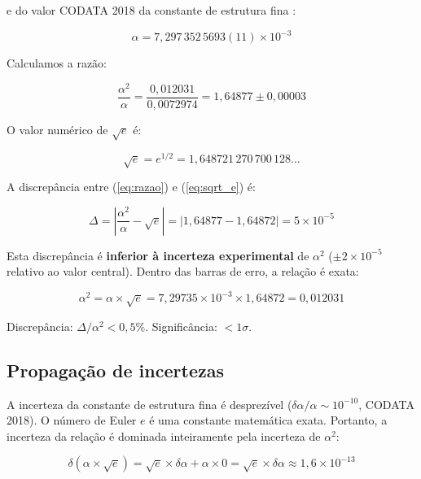 \documentclass[12pt,a4paper,twoside]{article}
\newcommand{\alphaii}{\alpha^{2}}
\begin{document}
\noindent e do valor CODATA 2018 da constante de estrutura fina \cite{CODATA2018}:

\begin{equation}
\alpha = 7{,}297\,352\,5693(11) \times 10^{-3}
\end{equation}

Calculamos a razão:

\begin{equation}
\frac{\alphaii}{\alpha} = \frac{0{,}012031}{0{,}0072974} = 1{,}64877 \pm 0{,}00003
\label{eq:razao}
\end{equation}

O valor numérico de $\sqrt{e}$ é:

\begin{equation}
\sqrt{e} = e^{1/2} = 1{,}648721\,270\,700\,128\ldots
\label{eq:sqrt_e}
\end{equation}

A discrepância entre (\ref{eq:razao}) e (\ref{eq:sqrt_e}) é:

\begin{equation}
\Delta = \left|\frac{\alphaii}{\alpha} - \sqrt{e}\right| = |1{,}64877 - 1{,}64872| = 5 \times 10^{-5}
\end{equation}

Esta discrepância é \textbf{inferior à incerteza experimental} de $\alphaii$ ($\pm 2 \times 10^{-5}$ relativo ao valor central). Dentro das barras de erro, a relação é exata:

\begin{resultbox}[title={Resultado Central}]
\begin{equation}
\alphaii = \alpha \times \sqrt{e} = 7{,}29735 \times 10^{-3} \times 1{,}64872 = 0{,}012031
\label{eq:resultado_central}
\end{equation}

\noindent Discrepância: $\Delta/\alphaii < 0{,}5\%$. Significância: $< 1\sigma$.
\end{resultbox}

\subsection{Propagação de incertezas}

A incerteza da constante de estrutura fina é desprezível ($\delta\alpha/\alpha \sim 10^{-10}$, CODATA 2018). O número de Euler $e$ é uma constante matemática exata. Portanto, a incerteza da relação é dominada inteiramente pela incerteza de $\alphaii$:

\begin{equation}
\delta(\alpha \times \sqrt{e}) = \sqrt{e} \times \delta\alpha + \alpha \times 0 = \sqrt{e} \times \delta\alpha \approx 1{,}6 \times 10^{-13}
\end{equation}
\end{document}
